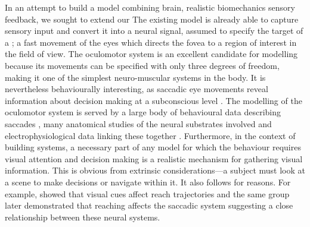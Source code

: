 \documentclass{frontiersSCNS}
\begin{document}
In an attempt to build a model combining brain, realistic
biomechanics  sensory feedback, we sought to extend our
%
The existing
model \citep{cope_basal_2017} is already able to capture sensory input
and convert it into a neural signal, assumed to specify the target of
a ; a fast movement of the eyes which directs
the fovea to a region of interest in the field of view.
%
The oculomotor system is an excellent candidate for modelling because
its movements can be specified with only three degrees of freedom,
making it one of the simplest neuro-muscular systems in the body.
%
It is nevertheless behaviourally interesting, as saccadic eye
movements reveal information about decision making at a subconscious
level
\citep{deubel_saccade_1996,reppert_modulation_2015,marcos_determining_2016}.
The modelling of the oculomotor system is served by a large body of
behavioural data describing
saccades \citep{tipper_reaching_2001,walker_effect_1997,casteau_effect_2012},
many anatomical studies of the neural substrates involved
\citep{meredith_intrinsic_1998,isa_intrinsic_2002,isa_exploring_2009}
and electrophysiological data linking these together
\citep{hepp_spatio-temporal_1983,dorris_neuronal_1997,mcpeek_competition_2003,vokoun_circuit_2011}.
Furthermore, in the context of building  systems, a
necessary part of any model for which the behaviour requires visual
attention and decision making is a realistic mechanism for gathering
visual information.  This is obvious from extrinsic considerations---a
subject must look at a scene to make decisions or navigate within
it. It also follows for  reasons. For
example, \cite{howard_hand_1997} showed that visual cues affect reach
trajectories and the same group later demonstrated that reaching
affects the saccadic system
\citep{tipper_reaching_2001} suggesting a close relationship between these
neural systems. 
\end{document}
